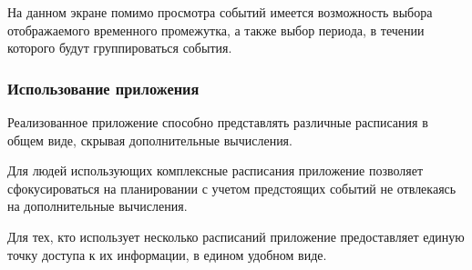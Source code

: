 
На данном экране помимо просмотра событий имеется возможность выбора отображаемого временного промежутка, а также выбор периода, в течении которого будут группироваться события.

\subsubsection{Использование приложения}

Реализованное приложение способно представлять различные расписания в общем виде, скрывая дополнительные вычисления.

Для людей использующих комплексные расписания приложение позволяет сфокусироваться на планировании с учетом предстоящих событий не отвлекаясь на дополнительные вычисления.

Для тех, кто использует несколько расписаний приложение предоставляет единую точку доступа к их информации, в едином удобном виде.

\clearpage